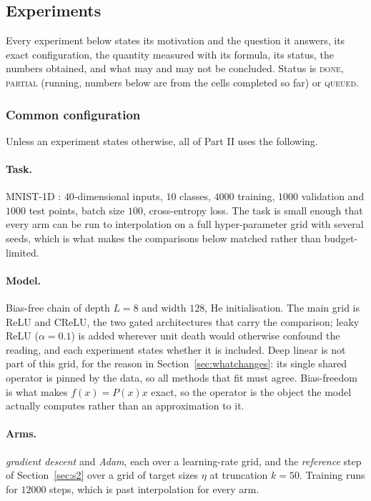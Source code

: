 \documentclass{article} %
\theoremstyle{plain}
\theoremstyle{definition}
\theoremstyle{remark}
\begin{document}
\subsection{Experiments}
\label{sec:nonlinear-exp}

Every experiment below states its motivation and the question it answers, its exact configuration,
the quantity measured with its formula, its status, the numbers obtained, and what may and may not
be concluded. Status is \textsc{done}, \textsc{partial} (running, numbers below are from the cells
completed so far) or \textsc{queued}.

\subsubsection{Common configuration}
\label{sec:common-setup}

Unless an experiment states otherwise, all of Part II uses the following.

\paragraph{Task.} MNIST-1D \citep{greydanus2020mnist1d}: $40$-dimensional inputs, $10$ classes,
$4000$ training, $1000$ validation and $1000$ test points, batch size $100$, cross-entropy loss.
The task is small enough that every arm can be run to interpolation on a full hyper-parameter grid
with several seeds, which is what makes the comparisons below matched rather than budget-limited.

\paragraph{Model.} Bias-free chain of depth $L = 8$ and width $128$, He initialisation. The main
grid is ReLU and CReLU, the two gated architectures that carry the comparison; leaky ReLU
($\alpha = 0.1$) is added wherever unit death would otherwise confound the reading, and each
experiment states whether it is included. Deep linear is not part of this grid, for the reason in
Section~\ref{sec:whatchanges}: its single shared operator is pinned by the data, so all methods
that fit must agree. Bias-freedom is what makes
$f(x) = P(x)x$ exact, so the operator is the object the model actually computes rather than an
approximation to it.

\paragraph{Arms.} \emph{gradient descent} and \emph{Adam}, each over a learning-rate grid, and the
\emph{reference} step of Section~\ref{sec:s2} over a grid of target sizes $\eta$ at truncation
$k = 50$. Training runs for $12000$ steps, which is past interpolation for every arm.
\end{document}
